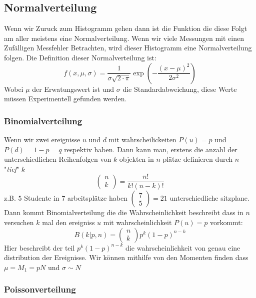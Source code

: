 \documentclass{article}
\begin{document}
\hypertarget{Normalverteilung}{\subsection*{Normalverteilung}}
Wenn wir Zuruck zum Histogramm gehen dann ist die Funktion die diese Folgt am aller meistens eine Normalverteilung. Wenn wir viele Messungen mit einen Zufälligen Messfehler Betrachten, wird dieser Histogramm eine Normalverteilung folgen.
Die Definition dieser Normalverteilung ist:
\[f(x,\mu,\sigma)=\frac{1}{\sigma\sqrt{2\cdot\pi}}\exp\left(-\frac{(x-\mu)^2}{2\sigma^2}\right)\]
Wobei $\mu$ der Erwatungswert ist und $\sigma$ die Standardabweichung, diese Werte müssen Experimentell gefunden werden.
\hypertarget{Binomialverteilung}{\subsubsection*{Binomialverteilung}}
Wenn wir zwei ereignisse $u$ und $d$ mit wahrscheilickeiten $P(u)=p$ und $P(d)=1-p=q$ respektiv haben. Dann kann man, erstens die anzahl der unterschiedlichen Reihenfolgen von $k$ objekten in $n$ plätze definieren durch $n$ "\textit{tief}" $k$\[\begin{pmatrix}n\\k\end{pmatrix}=\frac{n!}{k!(n-k)!}\] z.B. $5$ Studente in $7$ arbeitsplätze haben $\begin{pmatrix}7\\5\end{pmatrix}=21$ unterschiedliche sitzplane.
Dann kommt Binomialverteilung die die Wahrscheinlichkeit beschreibt dass in $n$ versuchen $k$ mal den ereigniss $u$ mit wahrscheinlichkeit $P(u)=p$ vorkommt:
\[B(k|p,n)=\begin{pmatrix}n\\k\end{pmatrix}p^k(1-p)^{n-k}\] Hier beschreibt der teil $p^k(1-p)^{n-k}$ die wahrscheinlichkeit von genau eine distribution der Ereignisse.
\newline Wir können mithilfe von den Momenten finden dass $\mu=M_1=pN$ und $\sigma\sim N$
\hypertarget{poissonverteilung}{\subsubsection*{Poissonverteilung}}
\end{document}
